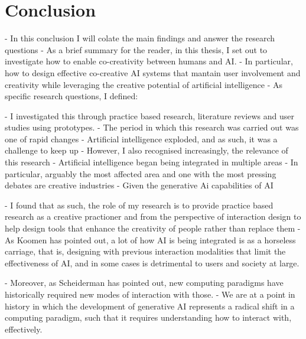 \chapter{Conclusion}\label{c:conclusion}

- In this conclusion I will colate the main findings and answer the research questions
- As a brief summary for the reader, in this thesis, I set out to investigate how to enable co-creativity between humans and AI. 
- In particular, how to design effective co-creative AI systems that mantain user involvement and creativity while leveraging the creative potential of artificial intelligence
- As specific research questions, I defined: 


- I investigated this through practice based research, literature reviews and user studies using prototypes. 
- The period in which this research was carried out was one of rapid changes
- Artificial intelligence exploded, and as such, it was a challenge to keep up
- However, I also recognised increasingly, the relevance of this research
- Artificial intelligence began being integrated in multiple areas
- In particular, arguably the most affected area and one with the most pressing debates are creative industries
- Given the generative Ai capabilities of AI

- I found that as such, the role of my research is to provide practice based research as a creative practioner and from the perspective of interaction design to help design tools that enhance the creativity of people rather than replace them
- As Koomen has pointed out, a lot of how AI is being integrated is as a horseless carriage, that is, designing with previous interaction modalities that limit the effectiveness of AI, and in some cases is detrimental to users and society at large. 

- Moreover, as Scheiderman has pointed out, new computing paradigms have historically required new modes of interaction with those. 
- We are at a point in history in which the development of generative AI represents a radical shift in a computing paradigm, such that it requires understanding how to interact with, effectively. 

